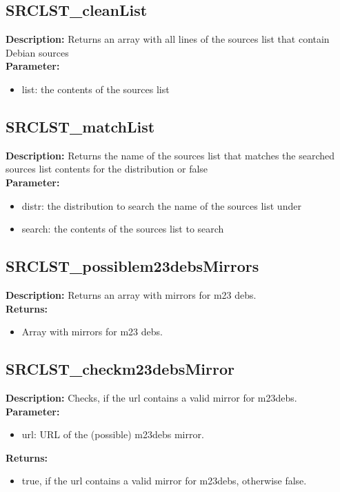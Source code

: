 \subsection{SRCLST\_cleanList}
\textbf{Description:} Returns an array with all lines of the sources list that contain Debian sources\\
\textbf{Parameter:}
\begin{itemize}
\item list: the contents of the sources list
\end{itemize}

\subsection{SRCLST\_matchList}
\textbf{Description:} Returns the name of the sources list that matches the searched sources list contents for the distribution or false\\
\textbf{Parameter:}
\begin{itemize}
\item distr: the distribution to search the name of the sources list under
\item search: the contents of the sources list to search
\end{itemize}

\subsection{SRCLST\_possiblem23debsMirrors}
\textbf{Description:} Returns an array with mirrors for m23 debs.\\
\textbf{Returns:}
\begin{itemize}
\item Array with mirrors for m23 debs.
\end{itemize}

\subsection{SRCLST\_checkm23debsMirror}
\textbf{Description:} Checks, if the url contains a valid mirror for m23debs.\\
\textbf{Parameter:}
\begin{itemize}
\item url: URL of the (possible) m23debs mirror.
\end{itemize}
\textbf{Returns:}
\begin{itemize}
\item true, if the url contains a valid mirror for m23debs, otherwise false.
\end{itemize}

